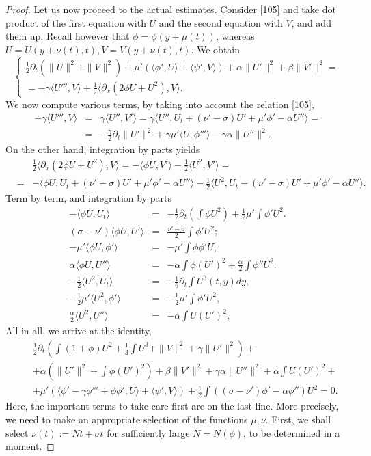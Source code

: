 \documentclass[10pt,a4paper]{amsart}
\newcommand{\al}{\alpha}
\newcommand{\be}{\beta}
\newcommand{\dpr}[2]{\langle #1,#2 \rangle}
\newcommand{\f}[2]{\frac{#1}{#2}}
\newcommand{\ga}{\gamma}
\newcommand{\p}{\partial}
\newcommand{\si}{\sigma}
\begin{document}
\begin{proof}
Let us now proceed to the actual estimates. Consider  \eqref{105} and  take dot product of the first equation with $U$ and the second equation with $V$, and add them up. Recall however that $\phi=\phi(y+\mu(t))$, whereas $U=U(y+\nu(t),t), V=V(y+\nu(t),t)$.
We obtain 
\begin{equation}
\label{110} 
\begin{cases}
	\f{1}{2} \p_t\left( \|U\|^2+\|V\|^2\right)+\mu'(\dpr{\phi'}{U}+\dpr{\psi'}{V})+ \al \|U'\|^2+\be\|V'\|^2= \\
	= -\ga\dpr{U'''}{V}+\f{1}{2} \dpr{\p_x (2\phi U+U^2)}{V}.
\end{cases}	
\end{equation}
We now compute various terms, by taking into account the relation \eqref{105}, 
\begin{eqnarray*}
	-\ga\dpr{U'''}{V} &=& \ga \dpr{U''}{V'}= \ga \dpr{U''}{U_t+(\nu'-\si)   U'+\mu'\phi'-\al U''}= \\
	&=& -\f{\ga}{2} \p_t \|U'\|^2+\ga\mu'\dpr{U}{\phi'''}-\ga \al \|U''\|^2. 
\end{eqnarray*}
On the other hand, integration by parts yields 
\begin{eqnarray*}
& & 	\f{1}{2}  \dpr{\p_x (2\phi U+U^2)}{V} = -\dpr{\phi U}{V'}-\f{1}{2}  \dpr{U^2}{V'}=  \\
	&=& - \dpr{\phi U}{U_t+(\nu'-\si) U'+\mu'\phi'-\al U''}- \f{1}{2}  \dpr{U^2}{U_t- (\nu'-\si)   U'+\mu'\phi'-\al U''}. 
\end{eqnarray*}
Term by term, and integration by parts 
\begin{eqnarray*}
	- \dpr{\phi U}{U_t} & = & -\f{1}{2} \p_t \left( \int \phi U^2 \right) +\f{1}{2}  \mu' \int \phi' U^2. \\
	(\si-\nu')  \dpr{\phi U}{U'} &=& \f{\nu'-\si}{2} \int \phi' U^2; \\
	- \mu' \dpr{\phi U}{\phi'}  &=&    -\mu' \int \phi\phi' U, \\
\al  \dpr{\phi U}{U''} &=& - \al \int \phi (U')^2 + \f{\al}{2}  \int \phi'' U^2. \\
-\f{1}{2} \dpr{U^2}{U_t} &=& -\f{1}{6} \p_t \int U^3(t,y) dy,\\
-\f{1}{2} \mu'\dpr{U^2}{\phi'} &=& -\f{1}{2} \mu'\int \phi' U^2,       \\ 
\f{\al}{2}   \dpr{U^2}{U''} &=& - \al \int  U (U')^2, 
\end{eqnarray*}
	All in all, we arrive at the identity, 
	\begin{eqnarray*}
	& &	\f{1}{2} \p_t\left( \int (1+ \phi) U^2+\f{1}{3} \int U^3+\|V\|^2+ \ga \|U'\|^2 \right)+\\
	& & + \al (\|U'\|^2+\int \phi (U')^2) + \be\|V'\|^2 + \ga \al \|U''\|^2+ \al \int  U (U')^2+ \\
& & + \mu'\left(\dpr{\phi'-\ga \phi'''+  \phi\phi'}{U} +\dpr{\psi'}{V}\right)+\f{1}{2}  \int  ((\si-\nu')  \phi' - \al \phi'')  U^2  =0.
	\end{eqnarray*}
 Here, the important terms to take care first are on the last line. More precisely, we need to make an appropriate selection of the functions $\mu, \nu$. First, we shall select $\nu(t):=N t+\si t$ for sufficiently large $N=N(\phi)$, to be determined in a moment. 
 

\end{proof}
\end{document}
